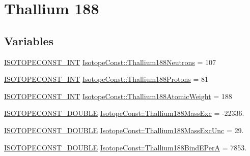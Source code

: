 \hypertarget{group___isotope_const-_thallium-_tl188}{}\section{Thallium 188}
\label{group___isotope_const-_thallium-_tl188}
\subsection*{Variables}
\begin{DoxyCompactItemize}
\item 
\mbox{\hyperlink{group___isotope_const-_macros_ga5f18360b3e99483a35c32d789e62621c}{I\+S\+O\+T\+O\+P\+E\+C\+O\+N\+S\+T\+\_\+\+I\+NT}} \mbox{\hyperlink{group___isotope_const-_thallium-_tl188_gac111e408985a93ae231bbe8ef6be451f}{Isotope\+Const\+::\+Thallium188\+Neutrons}} = 107
\item 
\mbox{\hyperlink{group___isotope_const-_macros_ga5f18360b3e99483a35c32d789e62621c}{I\+S\+O\+T\+O\+P\+E\+C\+O\+N\+S\+T\+\_\+\+I\+NT}} \mbox{\hyperlink{group___isotope_const-_thallium-_tl188_ga60fb7ce286fc7b7bc282145a81059416}{Isotope\+Const\+::\+Thallium188\+Protons}} = 81
\item 
\mbox{\hyperlink{group___isotope_const-_macros_ga5f18360b3e99483a35c32d789e62621c}{I\+S\+O\+T\+O\+P\+E\+C\+O\+N\+S\+T\+\_\+\+I\+NT}} \mbox{\hyperlink{group___isotope_const-_thallium-_tl188_ga4dd973ca304aef12419c7706b3778595}{Isotope\+Const\+::\+Thallium188\+Atomic\+Weight}} = 188
\item 
\mbox{\hyperlink{group___isotope_const-_macros_ga8f45a7272ce02c0b4c65c44636ed719a}{I\+S\+O\+T\+O\+P\+E\+C\+O\+N\+S\+T\+\_\+\+D\+O\+U\+B\+LE}} \mbox{\hyperlink{group___isotope_const-_thallium-_tl188_gaa3fc9333ba174d63b9eacec1622aaed8}{Isotope\+Const\+::\+Thallium188\+Mass\+Exc}} = -\/22336.
\item 
\mbox{\hyperlink{group___isotope_const-_macros_ga8f45a7272ce02c0b4c65c44636ed719a}{I\+S\+O\+T\+O\+P\+E\+C\+O\+N\+S\+T\+\_\+\+D\+O\+U\+B\+LE}} \mbox{\hyperlink{group___isotope_const-_thallium-_tl188_gab862d7606c0f14f8b087a8621fc9ee4e}{Isotope\+Const\+::\+Thallium188\+Mass\+Exc\+Unc}} = 29.
\item 
\mbox{\hyperlink{group___isotope_const-_macros_ga8f45a7272ce02c0b4c65c44636ed719a}{I\+S\+O\+T\+O\+P\+E\+C\+O\+N\+S\+T\+\_\+\+D\+O\+U\+B\+LE}} \mbox{\hyperlink{group___isotope_const-_thallium-_tl188_ga85a2cff7e100e1e04d986dc15a48d6c7}{Isotope\+Const\+::\+Thallium188\+Bind\+E\+PerA}} = 7853.
\item 

\end{DoxyCompactItemize}
